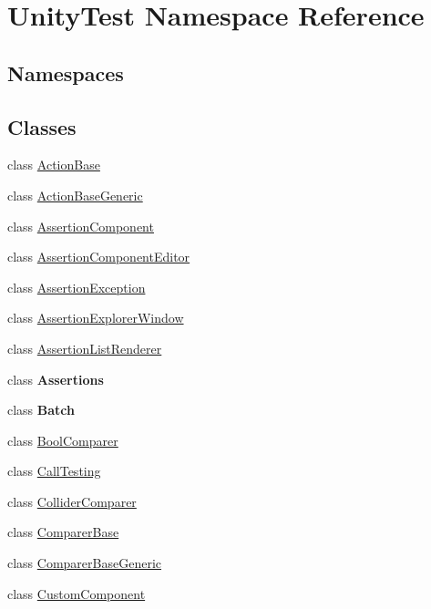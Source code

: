 \hypertarget{namespace_unity_test}{}\section{Unity\+Test Namespace Reference}
\label{namespace_unity_test}
\subsection*{Namespaces}
\begin{DoxyCompactItemize}
\end{DoxyCompactItemize}
\subsection*{Classes}
\begin{DoxyCompactItemize}
\item 
class \hyperlink{class_unity_test_1_1_action_base}{Action\+Base}
\item 
class \hyperlink{class_unity_test_1_1_action_base_generic}{Action\+Base\+Generic}
\item 
class \hyperlink{class_unity_test_1_1_assertion_component}{Assertion\+Component}
\item 
class \hyperlink{class_unity_test_1_1_assertion_component_editor}{Assertion\+Component\+Editor}
\item 
class \hyperlink{class_unity_test_1_1_assertion_exception}{Assertion\+Exception}
\item 
class \hyperlink{class_unity_test_1_1_assertion_explorer_window}{Assertion\+Explorer\+Window}
\item 
class \hyperlink{class_unity_test_1_1_assertion_list_renderer}{Assertion\+List\+Renderer}
\item 
class {\bfseries Assertions}
\item 
class {\bfseries Batch}
\item 
class \hyperlink{class_unity_test_1_1_bool_comparer}{Bool\+Comparer}
\item 
class \hyperlink{class_unity_test_1_1_call_testing}{Call\+Testing}
\item 
class \hyperlink{class_unity_test_1_1_collider_comparer}{Collider\+Comparer}
\item 
class \hyperlink{class_unity_test_1_1_comparer_base}{Comparer\+Base}
\item 
class \hyperlink{class_unity_test_1_1_comparer_base_generic}{Comparer\+Base\+Generic}
\item 
class \hyperlink{class_unity_test_1_1_custom_component}{Custom\+Component}

\end{DoxyCompactItemize}
